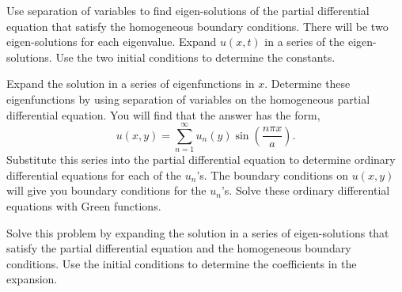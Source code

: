 {%
\begin{Hint}
  \label{hint heat radiation bc 2 series solutions}
\end{Hint}





\begin{Hint}
  \label{hint pt=A2x2pxx}
\end{Hint}



\begin{Hint}
  \label{hint wave fixed free end zero}
  Use separation of variables to find eigen-solutions of the partial differential
  equation that satisfy the homogeneous boundary conditions.  There will
  be two eigen-solutions for each eigenvalue.  Expand $u(x,t)$ in a series
  of the eigen-solutions.  Use the two initial conditions to determine the
  constants.
\end{Hint}



\begin{Hint}
  \label{hint potential 2d block zero insulated}
  Expand the solution in a series of eigenfunctions in $x$.  Determine these
  eigenfunctions by using separation of variables on the homogeneous 
  partial differential equation.   You will find that the answer has the form,
  \[
  u(x,y) = \sum_{n=1}^\infty u_n(y) \sin \left( \frac{n \pi x}{a} \right).
  \]
  Substitute this series into the partial differential equation to determine
  ordinary differential equations for each of the $u_n$'s.  The boundary
  conditions on $u(x,y)$ will give you boundary conditions for the $u_n$'s.
  Solve these ordinary differential equations with Green functions.
\end{Hint}







\begin{Hint}
  \label{hint vibrations of a beam}
  Solve this problem by expanding the solution in a series of 
  eigen-solutions that satisfy the partial differential equation and the 
  homogeneous boundary conditions.  Use the initial conditions
  to determine the coefficients in the expansion.
\end{Hint}


}

